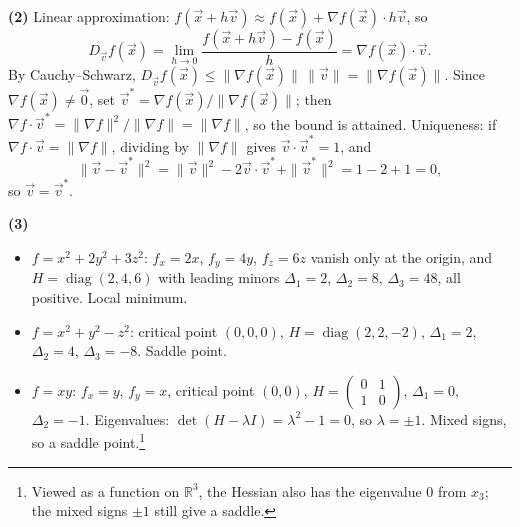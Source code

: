 \documentclass{article}
\newcommand{\R}{\mathbb{R}}
\begin{document}
\textbf{(2)} Linear approximation: $f(\vec{x} + h\vec{v}) \approx f(\vec{x}) + \nabla f(\vec{x})\cdot h\vec{v}$, so
\begin{equation*}
    D_{\vec{v}}f(\vec{x}) = \lim_{h\to0}\frac{f(\vec{x}+h\vec{v}) - f(\vec{x})}{h} = \nabla f(\vec{x})\cdot\vec{v}.
\end{equation*}
By Cauchy--Schwarz, $D_{\vec{v}}f(\vec{x}) \leq \|\nabla f(\vec{x})\|\,\|\vec{v}\| = \|\nabla f(\vec{x})\|$. Since $\nabla f(\vec{x}) \neq \vec{0}$, set $\vec{v}^* = \nabla f(\vec{x})/\|\nabla f(\vec{x})\|$; then $\nabla f\cdot\vec{v}^* = \|\nabla f\|^2/\|\nabla f\| = \|\nabla f\|$, so the bound is attained.
Uniqueness: if $\nabla f\cdot\vec{v} = \|\nabla f\|$, dividing by $\|\nabla f\|$ gives $\vec{v}\cdot\vec{v}^* = 1$, and
\begin{equation*}
    \|\vec{v} - \vec{v}^*\|^2 = \|\vec{v}\|^2 - 2\vec{v}\cdot\vec{v}^* + \|\vec{v}^*\|^2 = 1 - 2 + 1 = 0,
\end{equation*}
so $\vec{v} = \vec{v}^*$.

\textbf{(3)}
\begin{itemize}
    \item $f = x^2 + 2y^2 + 3z^2$: $f_x = 2x$, $f_y = 4y$, $f_z = 6z$ vanish only at the origin, and $H = \operatorname{diag}(2,4,6)$ with leading minors $\Delta_1 = 2$, $\Delta_2 = 8$, $\Delta_3 = 48$, all positive. Local minimum.
    \item $f = x^2 + y^2 - z^2$: critical point $(0,0,0)$, $H = \operatorname{diag}(2,2,-2)$, $\Delta_1 = 2$, $\Delta_2 = 4$, $\Delta_3 = -8$. Saddle point.
    \item $f = xy$: $f_x = y$, $f_y = x$, critical point $(0,0)$, $H = \begin{pmatrix}0&1\\1&0\end{pmatrix}$, $\Delta_1 = 0$, $\Delta_2 = -1$. Eigenvalues: $\det(H - \lambda I) = \lambda^2 - 1 = 0$, so $\lambda = \pm1$. Mixed signs, so a saddle point.\footnote{Viewed as a function on $\R^3$, the Hessian also has the eigenvalue $0$ from $x_3$; the mixed signs $\pm1$ still give a saddle.}
\end{itemize}

\label{sol:a1-11}
\end{document}
